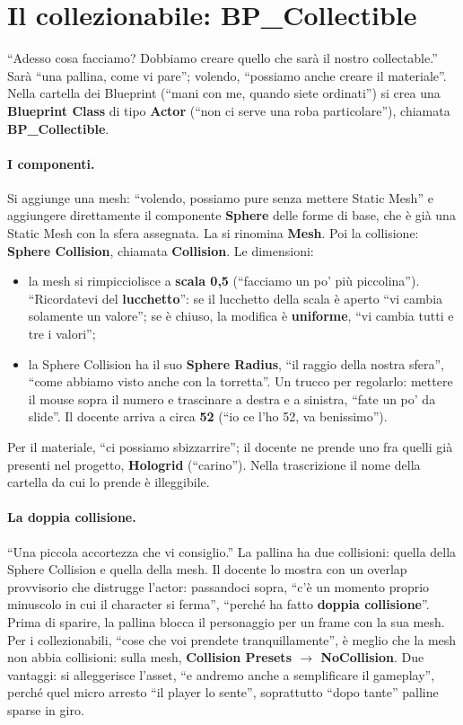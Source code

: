 \section{Il collezionabile: BP\_Collectible}
\label{ue8:sec:collectible}

``Adesso cosa facciamo? Dobbiamo creare quello che sarà il nostro collectable.'' Sarà
``una pallina, come vi pare''; volendo, ``possiamo anche creare il materiale''. Nella
cartella dei Blueprint (``mani con me, quando siete ordinati'') si crea una
\textbf{Blueprint Class} di tipo \textbf{Actor} (``non ci serve una roba particolare''),
chiamata \textbf{BP\_Collectible}.

\paragraph{I componenti.} Si aggiunge una mesh: ``volendo, possiamo pure senza mettere
Static Mesh'' e aggiungere direttamente il componente \textbf{Sphere} delle forme di
base, che è già una Static Mesh con la sfera assegnata. La si rinomina \textbf{Mesh}. Poi
la collisione: \textbf{Sphere Collision}, chiamata \textbf{Collision}. Le dimensioni:
\begin{itemize}
  \item la mesh si rimpicciolisce a \textbf{scala 0,5} (``facciamo un po' più
        piccolina''). ``Ricordatevi del \textbf{lucchetto}'': se il lucchetto della scala
        è aperto ``vi cambia solamente un valore''; se è chiuso, la modifica è
        \textbf{uniforme}, ``vi cambia tutti e tre i valori'';
  \item la Sphere Collision ha il suo \textbf{Sphere Radius}, ``il raggio della nostra
        sfera'', ``come abbiamo visto anche con la torretta''. Un trucco per regolarlo:
        mettere il mouse sopra il numero e trascinare a destra e a sinistra, ``fate un
        po' da slide''. Il docente arriva a circa \textbf{52} (``io ce l'ho 52, va
        benissimo'').
\end{itemize}
Per il materiale, ``ci possiamo sbizzarrire''; il docente ne prende uno fra quelli già
presenti nel progetto, \textbf{Hologrid} (``carino''). Nella trascrizione il nome della
cartella da cui lo prende è illeggibile.

\paragraph{La doppia collisione.} ``Una piccola accortezza che vi consiglio.'' La pallina
ha due collisioni: quella della Sphere Collision e quella della mesh. Il docente lo
mostra con un overlap provvisorio che distrugge l'actor: passandoci sopra, ``c'è un
momento proprio minuscolo in cui il character si ferma'', ``perché ha fatto
\textbf{doppia collisione}''. Prima di sparire, la pallina blocca il personaggio per un
frame con la sua mesh. Per i collezionabili, ``cose che voi prendete tranquillamente'', è
meglio che la mesh non abbia collisioni: sulla mesh, \textbf{Collision Presets
$\rightarrow$ NoCollision}. Due vantaggi: si alleggerisce l'asset, ``e andremo anche a
semplificare il gameplay'', perché quel micro arresto ``il player lo sente'', soprattutto
``dopo tante'' palline sparse in giro.

